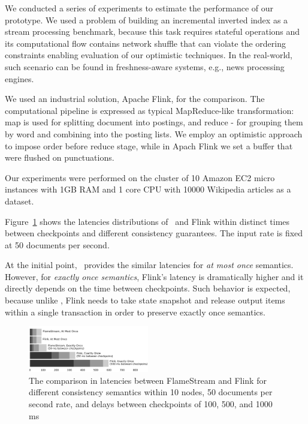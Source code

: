 \label {fs-short-experiments}

We conducted a series of experiments to estimate the performance of our prototype. We used a problem of building an incremental inverted index as a stream processing benchmark, because this task requires stateful operations and its computational flow contains network shuffle that can violate the ordering constraints enabling evaluation of our optimistic techniques. In the real-world, such scenario can be found in freshness-aware systems, e.g., news processing engines.

We used an industrial solution, Apache Flink, for the comparison. The computational pipeline is expressed as typical MapReduce-like transformation: map is used for splitting document into postings, and reduce - for grouping them by word and combining into the posting lists. We employ an optimistic approach to impose order before reduce stage, while in Apach Flink we set a buffer that were flushed on punctuations.

Our experiments were performed on the cluster of 10 Amazon EC2 micro instances with 1GB RAM and 1 core CPU with 10000 Wikipedia articles as a dataset.

Figure~\ref{performance} shows the latencies distributions of \FlameStream\ and Flink within distinct times between checkpoints and different consistency guarantees. The input rate is fixed at 50 documents per second.

At the initial point, \FlameStream\ provides the similar latencies for {\it at most once} semantics. However, for {\it exactly once semantics}, Flink's latency is dramatically higher and it directly depends on the time between checkpoints. Such behavior is expected, because unlike \FlameStream, Flink needs to take state snapshot and release output items within a single transaction in order to preserve exactly once semantics.

\begin{figure}[htbp]
  \centering
  \includegraphics[width=0.47\textwidth]{pics/comparison}
  \caption{The comparison in latencies between FlameStream and Flink for different consistency semantics within 10 nodes, 50 documents per second rate, and delays between checkpoints of 100, 500, and 1000 ms}
  \label {performance}
\end{figure}
